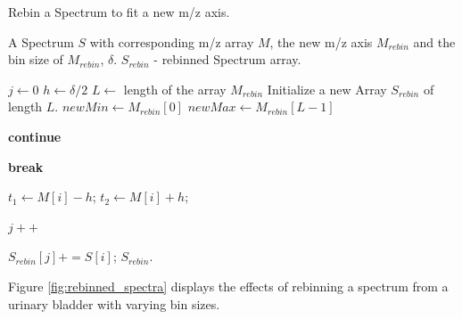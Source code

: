 \documentclass[11pt,openany]{book}
\begin{document}
    \begin{algorithm}
        \caption{Rebin a Spectrum to fit a new m/z axis.}

        \begin{algorithmic}
        
            \Require A Spectrum $S$ with corresponding m/z array $M$, the new m/z axis $M_{rebin}$ and the bin size of $M_{rebin}$, $\delta$.
            \Ensure $S_{rebin}$ - rebinned Spectrum array.
            
            
            \State $j \gets 0$
            \State $h \gets \delta / 2$
            \State $L \gets $ length of the array $M_{rebin}$
            \State Initialize a new Array $S_{rebin}$ of length $L$.
            \State $newMin \gets M_{rebin}[0]$
            \State $newMax \gets M_{rebin}[L-1]$
            
                    \State \textbf{continue}
                \EndIf
                
                    \State \textbf{break}
                \EndIf
                
                \State $t_1 \leftarrow M[i] - h$;
                \State $t_2 \leftarrow M[i] + h$;
                
                    \State $j++$
                \EndWhile
                
                
                    \State $S_{rebin}[j] += S[i]$;
                \EndIf
            \EndFor
            \State \Return $S_{rebin}$.
            \EndProcedure
        \end{algorithmic}
    \end{algorithm}


Figure \ref{fig:rebinned_spectra} displays the effects of rebinning a spectrum from a urinary bladder with varying bin sizes.
\end{document}
